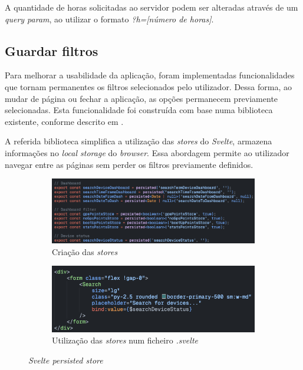 A quantidade de horas solicitadas ao servidor podem ser alteradas através de um \textit{query param}, ao utilizar o formato \textit{?h=[número de horas]}.

\subsection{Guardar filtros}\label{sec:saveFilters} %
Para melhorar a usabilidade da aplicação, foram implementadas funcionalidades que tornam permanentes os filtros selecionados pelo utilizador. Dessa forma, ao mudar de página ou fechar a aplicação, as opções permanecem previamente selecionadas. Esta funcionalidade foi construída com base numa biblioteca existente, conforme descrito em  \cite{persisted-store.joshnuss.url}.

A referida biblioteca simplifica a utilização das \textit{stores} do \textit{Svelte}, armazena informações no \textit{local storage} do \textit{browser}. Essa abordagem permite ao utilizador navegar entre as páginas sem perder os filtros previamente definidos.

\begin{figure}[!h]
	\centering
	\begin{subfigure}[c]{0.45\textwidth}
		\centering
		\includegraphics[width=\textwidth]{figs/store.png}
		\caption{Criação das \textit{stores}}
		\label{fig:store}
	\end{subfigure}
	\hfill
	\begin{subfigure}[c]{0.45\textwidth}
        \centering
        \includegraphics[width=\textwidth]{figs/store.svelte.png}
		\caption{Utilização das \textit{stores} num ficheiro \textit{.svelte}}
        \label{fig:store.svelte}
	\end{subfigure}
	\caption{\textit{Svelte persisted store}}
\end{figure}


